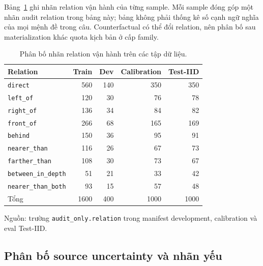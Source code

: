 Bảng~\ref{tab:setup-relation-distribution} ghi nhãn relation
vận hành của từng sample. Mỗi sample đóng góp một nhãn
audit relation trong bảng này; bảng không phải thống kê
số cạnh ngữ nghĩa của mọi mệnh đề trong câu.
Counterfactual có thể đổi relation, nên phân bố sau
materialization khác quota kịch bản ở cấp family.

\begin{table}[htbp]
    \centering
    \setlength{\tabcolsep}{4pt}
    \renewcommand{\arraystretch}{1.15}
    \caption{Phân bố nhãn relation vận hành trên các tập dữ liệu.}
    \label{tab:setup-relation-distribution}
    \small
    \begin{tabularx}{\textwidth}{@{}>{\raggedright\arraybackslash}Xrrrr@{}}
        \toprule
        Relation & Train & Dev & Calibration & Test-IID \\
        \midrule
        \texttt{direct} & 560 & 140 & 350 & 350 \\
        \texttt{left\_\allowbreak of} & 120 & 30 & 76 & 78 \\
        \texttt{right\_\allowbreak of} & 136 & 34 & 84 & 82 \\
        \texttt{front\_\allowbreak of} & 266 & 68 & 165 & 169 \\
        \texttt{behind} & 150 & 36 & 95 & 91 \\
        \texttt{nearer\_\allowbreak than} & 116 & 26 & 67 & 73 \\
        \texttt{farther\_\allowbreak than} & 108 & 30 & 73 & 67 \\
        \texttt{between\_\allowbreak in\_\allowbreak depth} & 51 & 21 & 33 & 42 \\
        \texttt{nearer\_\allowbreak than\_\allowbreak both} & 93 & 15 & 57 & 48 \\
        \midrule
        Tổng & 1600 & 400 & 1000 & 1000 \\
        \bottomrule
    \end{tabularx}
    \vspace{2pt}
    {\footnotesize\raggedright Nguồn: trường \texttt{audit\_\allowbreak only.relation}
    trong manifest development, calibration và eval Test-IID.\par}
\end{table}

\subsection{Phân bố source uncertainty và nhãn yếu}

